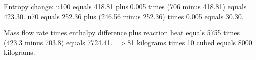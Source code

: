 Entropy change:  
u100 equals 418.81 plus 0.005 times (706 minus 418.81) equals 423.30.  
u70 equals 252.36 plus (246.56 minus 252.36) times 0.005 equals 30.30.  

Mass flow rate times enthalpy difference plus reaction heat equals 5755 times (423.3 minus 703.8) equals 7724.41.  
=> 81 kilograms times 10 cubed equals 8000 kilograms.